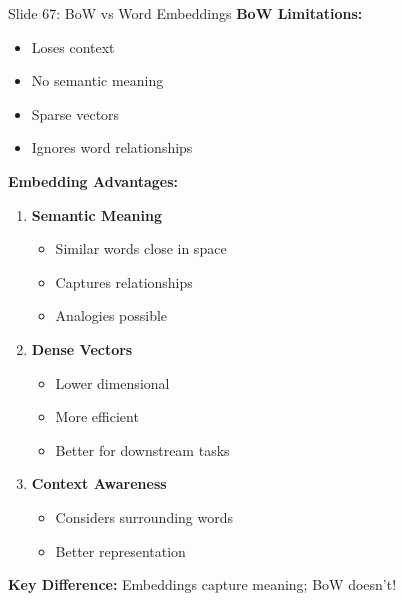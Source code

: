 \documentclass[8pt]{beamer}
\begin{document}
	\begin{frame}{Slide 67: BoW vs Word Embeddings}
		\fontsize{6.5}{7.5}\selectfont
		\textbf{BoW Limitations:}
		\begin{itemize}
			\item Loses context
			\item No semantic meaning
			\item Sparse vectors
			\item Ignores word relationships
		\end{itemize}
		
		\vspace{0.1cm}
		\textbf{Embedding Advantages:}
		\begin{enumerate}
			\item \textbf{Semantic Meaning}
			\begin{itemize}
				\item Similar words close in space
				\item Captures relationships
				\item Analogies possible
			\end{itemize}
			\item \textbf{Dense Vectors}
			\begin{itemize}
				\item Lower dimensional
				\item More efficient
				\item Better for downstream tasks
			\end{itemize}
			\item \textbf{Context Awareness}
			\begin{itemize}
				\item Considers surrounding words
				\item Better representation
			\end{itemize}
		\end{enumerate}
		
		\textcolor{myblue}{\textbf{Key Difference:}} Embeddings capture meaning; BoW doesn't!
	\end{frame}
	
\end{document}
